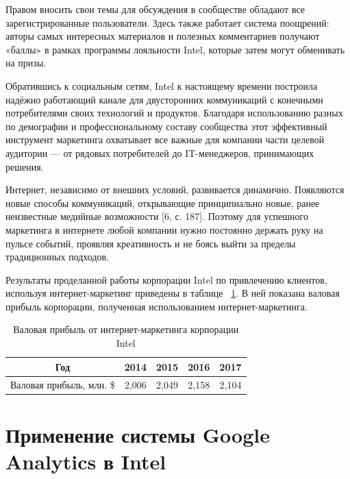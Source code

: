 \documentclass[a4paper,english,russian]{G2-105}
\begin{document}
\par Правом вносить свои темы для обсуждения в сообществе обладают все зарегистрированные пользователи. Здесь также работает система поощрений: авторы самых интересных материалов и полезных комментариев получают «баллы» в рамках программы лояльности Intel, которые затем могут обменивать на призы.
\par Обратившись к социальным сетям, Intel к настоящему времени построила надёжно работающий канале для двусторонних коммуникаций с конечными потребителями своих технологий и продуктов. Благодаря использованию разных по демографии и профессиональному составу сообщества этот эффективный инструмент маркетинга охватывает все важные для компании части целевой аудитории — от рядовых потребителей до IT-менеджеров, принимающих решения.
\par Интернет, независимо от внешних условий, развивается динамично. Появляются новые способы коммуникаций, открывающие принципиально новые, ранее неизвестные медийные возможности [6, с. 187]. Поэтому для успешного маркетинга в интернете любой компании нужно постоянно держать руку на пульсе событий, проявляя креативность и не боясь выйти за пределы традиционных подходов.
\par Результаты проделанной работы корпорации Intel по привлечению клиентов, используя интернет-маркетинг приведены в таблице ~\ref{money}. В ней показана валовая прибыль корпорации, полученная использованием интернет-маркетинга.
\begin{longtable}{|c|c|c|c|c|}
    \caption{Валовая прибыль от интернет-маркетинга корпорации Intel}\\ \hline
    \label{money} 
    Год & 2014 & 2015 & 2016 & 2017 \\ \hline
    Валовая прибыль, млн. \$ & 2,006 & 2,049 & 2,158 & 2,104 \\ \hline
\end{longtable}

\chapter{Применение системы Google Analytics в Intel}
\end{document}
